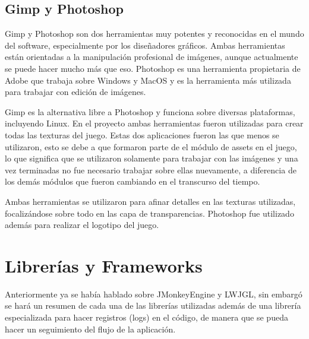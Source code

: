\documentclass[a4paper,12pt,openany,oneside]{book}
\begin{document}
\subsection{Gimp y Photoshop}
Gimp y Photoshop son dos herramientas muy potentes y reconocidas en el mundo del software, especialmente por los diseñadores gráficos. Ambas herramientas están orientadas a la manipulación profesional de imágenes, aunque actualmente se puede hacer mucho más que eso. Photoshop es una herramienta propietaria de Adobe que trabaja sobre Windows y MacOS y es la herramienta más utilizada para trabajar con edición de imágenes.

Gimp es la alternativa libre a Photoshop y funciona sobre diversas plataformas, incluyendo Linux. En el proyecto ambas herramientas fueron utilizadas para crear todas las texturas del juego. Estas dos aplicaciones fueron las que menos se utilizaron, esto se debe a que formaron parte de el módulo de assets en el juego, lo que significa que se utilizaron solamente para trabajar con las imágenes y una vez terminadas no fue necesario trabajar sobre ellas nuevamente, a diferencia de los demás módulos que fueron cambiando en el transcurso del tiempo.

Ambas herramientas se utilizaron para afinar detalles en las texturas utilizadas, focalizándose sobre todo en las capa de transparencias.
Photoshop fue utilizado además para realizar el logotipo del juego.
\section{Librerías y Frameworks}
Anteriormente ya se había hablado sobre JMonkeyEngine y LWJGL, sin embargó se hará un resumen de cada una de las librerías utilizadas además de una librería especializada para hacer registros (logs) en el código, de manera que se pueda hacer un seguimiento del flujo de la aplicación.
\end{document}
